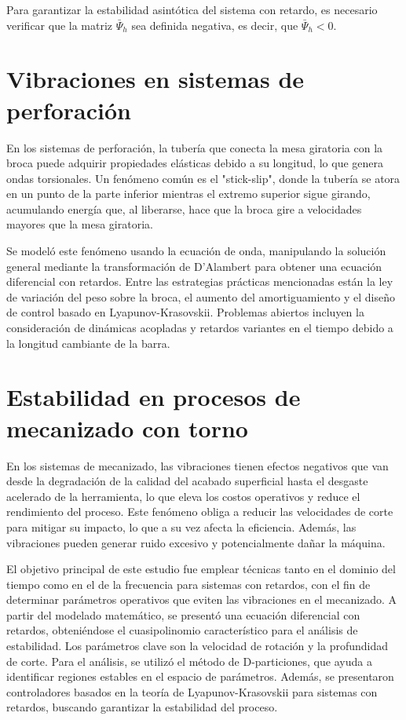 \documentclass[conference]{IEEEtran}
\begin{document}
Para garantizar la estabilidad asintótica del sistema con retardo, es necesario verificar que la matriz \( \bar{\Psi}_h \) sea definida negativa, es decir, que \( \bar{\Psi}_h < 0 \).

\section{Vibraciones en sistemas de perforación}

En los sistemas de perforación, la tubería que conecta la mesa giratoria con la broca puede adquirir propiedades elásticas debido a su longitud, lo que genera ondas torsionales. Un fenómeno común es el "stick-slip", donde la tubería se atora en un punto de la parte inferior mientras el extremo superior sigue girando, acumulando energía que, al liberarse, hace que la broca gire a velocidades mayores que la mesa giratoria.

Se modeló este fenómeno usando la ecuación de onda, manipulando la solución general mediante la transformación de D'Alambert para obtener una ecuación diferencial con retardos. Entre las estrategias prácticas mencionadas están la ley de variación del peso sobre la broca, el aumento del amortiguamiento y el diseño de control basado en Lyapunov-Krasovskii. Problemas abiertos incluyen la consideración de dinámicas acopladas y retardos variantes en el tiempo debido a la longitud cambiante de la barra.

\section{Estabilidad en procesos de mecanizado con torno}
En los sistemas de mecanizado, las vibraciones tienen efectos negativos que van desde la degradación de la calidad del acabado superficial hasta el desgaste acelerado de la herramienta, lo que eleva los costos operativos y reduce el rendimiento del proceso. Este fenómeno obliga a reducir las velocidades de corte para mitigar su impacto, lo que a su vez afecta la eficiencia. Además, las vibraciones pueden generar ruido excesivo y potencialmente dañar la máquina.

El objetivo principal de este estudio fue emplear técnicas tanto en el dominio del tiempo como en el de la frecuencia para sistemas con retardos, con el fin de determinar parámetros operativos que eviten las vibraciones en el mecanizado. A partir del modelado matemático, se presentó una ecuación diferencial con retardos, obteniéndose el cuasipolinomio característico para el análisis de estabilidad. Los parámetros clave son la velocidad de rotación y la profundidad de corte. Para el análisis, se utilizó el método de D-particiones, que ayuda a identificar regiones estables en el espacio de parámetros. Además, se presentaron controladores basados en la teoría de Lyapunov-Krasovskii para sistemas con retardos, buscando garantizar la estabilidad del proceso.
\end{document}
